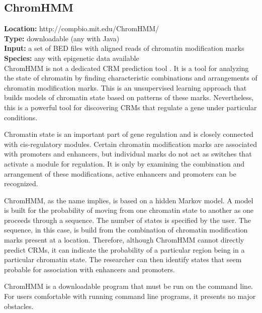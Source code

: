 \documentclass{frontiersENG} %
\begin{document}
\subsection{ChromHMM}
\noindent
\textbf{Location:} http://compbio.mit.edu/ChromHMM/ \\
\textbf{Type:} downloadable (any with Java) \\
\textbf{Input:} a set of BED files with aligned reads of chromatin modification marks \\
\textbf{Species:} any with epigenetic data available \\

ChromHMM is not a dedicated CRM prediction tool \cite{Ernst2012}. It
is a tool for analyzing the state of chromatin by finding
characteristic combinations and arrangements of chromatin modification
marks. This is an unsupervised learning approach that builds models of
chromatin state based on patterns of these marks. Nevertheless, this
is a powerful tool for discovering CRMs that regulate a gene under
particular conditions.

Chromatin state is an important part of gene regulation and is closely
connected with cis-regulatory modules. Certain chromatin modification
marks are associated with promoters and enhancers, but individual
marks do not act as switches that activate a module for regulation. It
is only by examining the combination and arrangement of these
modifications, active enhancers and promoters can be recognized.

ChromHMM, as the name implies, is based on a hidden Markov model. A
model is built for the probability of moving from one chromatin state
to another as one proceeds through a sequence. The number of states is
specified by the user. The sequence, in this case, is build from the
combination of chromatin modification marks present at a
location. Therefore, although ChromHMM cannot directly predict CRMs,
it can indicate the probability of a particular region being in a
particular chromatin state. The researcher can then identify states
that seem probable for association with enhancers and promoters.

ChromHMM is a downloadable program that must be run on the command
line. For users comfortable with running command line programs, it
presents no major obstacles.
\end{document}
